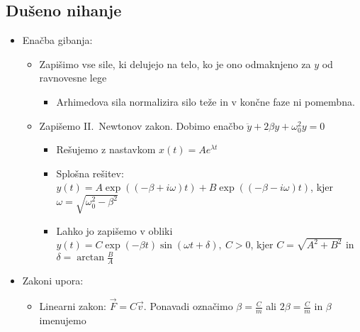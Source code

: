 \newpage
\subsection{Dušeno nihanje}
\begin{itemize}
    \item Enačba gibanja:
    \begin{itemize}
        \item Zapišimo vse sile, ki delujejo na telo, ko je ono odmaknjeno za \(y\) od ravnovesne lege
        \begin{itemize}
            \item Arhimedova sila normalizira silo teže in v končne faze ni pomembna.
        \end{itemize}
        \item Zapišemo II.\ Newtonov zakon. Dobimo enačbo \(\ddot{y} + 2\beta y + \omega_0^2y = 0\)
        \begin{itemize}
            \item Rešujemo z nastavkom \(x(t) = A e^{\lambda t}\)
            \item Splošna rešitev: \(y(t) = A \exp ((-\beta + i \omega)t) + B \exp ((-\beta - i \omega)t)\), kjer \(\omega = \sqrt{\omega_0^2 - \beta^2}\)
            \item Lahko jo zapišemo v obliki \(y(t) = C \exp(-\beta t) \sin(\omega t + \delta), \ C > 0\), kjer \(C = \sqrt{A^2 + B^2}\) in \(\delta = \arctan \frac{B}{A}\)
        \end{itemize}
    \end{itemize}
    \item Zakoni upora:
    \begin{itemize}
        \item Linearni zakon: \(\vec{F} = C \vec{v}\). Ponavadi označimo \(\beta = \frac{C}{m}\) ali \(2 \beta = \frac{C}{m}\) in \(\beta\) imenujemo 
    \end{itemize}
\end{itemize}


